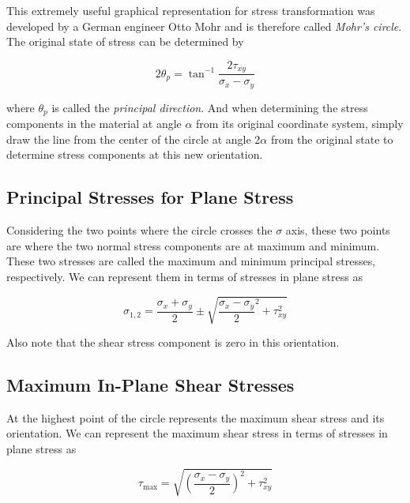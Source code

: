 \documentclass[
fontsize=10pt,
a4paper,
twosides=false,
open=any,
svgnames,
]{kaobook} %
\begin{document}
This extremely useful graphical representation for stress transformation was developed by a German engineer Otto Mohr and is therefore called \emph{Mohr’s circle}.
The original state of stress can be determined by

\begin{equation} \label{eqn: principal direction}
  2\theta_p = \tan^{-1}\frac{2\tau_{xy}}{\sigma_x - \sigma_y}
\end{equation}

where $\theta _p$ is called the \emph{principal direction}. And when determining the stress components in the material at angle $\alpha$ from its original coordinate system, simply draw the line from the center of the circle at angle $2\alpha$ from the original state to determine stress components at this new orientation.

\subsection{Principal Stresses for Plane Stress}

Considering the two points where the circle crosses the $\sigma$ axis, these two points are where the two normal stress components are at maximum and minimum. These two stresses are called the maximum and minimum principal stresses, respectively. We can represent them in terms of stresses in plane stress as

\begin{equation} \label{eqn: principal stresses}
  \sigma_{1,2} = \frac{\sigma_x + \sigma_y}{2} \pm \sqrt {\frac{\sigma_x - \sigma_y}{2}^2 + \tau _{xy}^2}
\end{equation}

Also note that the shear stress component is zero in this orientation.

\subsection{Maximum In-Plane Shear Stresses}

At the highest point of the circle represents the maximum shear stress and its orientation. We can represent the maximum shear stress in terms of stresses in plane stress as

\begin{equation} \label{eqn: max shear stress}
  \tau_{\max} = \sqrt {\left( \frac{\sigma_x - \sigma_y}{2} \right)^2 + \tau_{xy}^2}
\end{equation}
\end{document}
